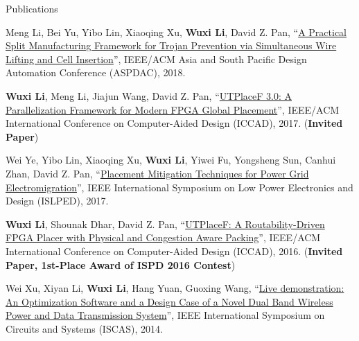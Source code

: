 \begin{rSection}{Publications}
\begin{description}[font=\normalfont]
\item[{[C5]}]{
    Meng Li, Bei Yu, Yibo Lin, Xiaoqing Xu, \textbf{Wuxi Li}, David Z. Pan,
    ``\href{https://ieeexplore.ieee.org/document/8297316}{A Practical Split Manufacturing Framework for Trojan Prevention via Simultaneous Wire Lifting and Cell Insertion}'',
    IEEE/ACM Asia and South Pacific Design Automation Conference (ASPDAC), 2018.
}

\item[{[C4]}]{
    \textbf{Wuxi Li}, Meng Li, Jiajun Wang, David Z. Pan,
    ``\href{https://ieeexplore.ieee.org/abstract/document/8203879/}{UTPlaceF 3.0: A Parallelization Framework for Modern FPGA Global Placement}'',
    IEEE/ACM International Conference on Computer-Aided Design (ICCAD), 2017.
    (\textbf{Invited Paper})
}

\item[{[C3]}]{
    Wei Ye, Yibo Lin, Xiaoqing Xu, \textbf{Wuxi Li}, Yiwei Fu, Yongsheng Sun, Canhui Zhan, David Z. Pan,
    ``\href{http://ieeexplore.ieee.org/document/8009178/}{Placement Mitigation Techniques for Power Grid Electromigration}'',
    IEEE International Symposium on Low Power Electronics and Design (ISLPED), 2017.
}

\item[{[C2]}]{
    \textbf{Wuxi Li}, Shounak Dhar, David Z. Pan,
    ``\href{http://ieeexplore.ieee.org/document/7827643/}{UTPlaceF: A Routability-Driven FPGA Placer with Physical and Congestion Aware Packing}'',
    IEEE/ACM International Conference on Computer-Aided Design (ICCAD), 2016.
    (\textbf{Invited Paper, 1st-Place Award of ISPD 2016 Contest})
}

\item[{[C1]}]{
    Wei Xu, Xiyan Li, \textbf{Wuxi Li}, Hang Yuan, Guoxing Wang,
    ``\href{http://ieeexplore.ieee.org/document/6865159/}{Live demonstration: An Optimization Software and a Design Case of a Novel Dual Band Wireless Power and Data Transmission System}'',
    IEEE International Symposium on Circuits and Systems (ISCAS), 2014.
}

\end{description}

\end{rSection}
